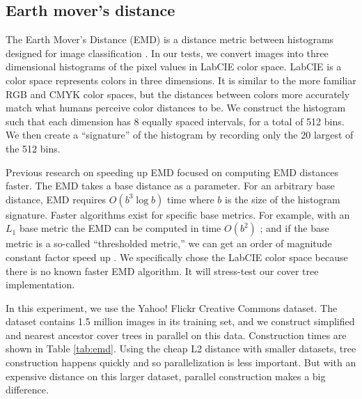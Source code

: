 \documentclass[thesis.tex]{subfiles}
\begin{document}
\subsection{Earth mover's distance}

The Earth Mover's Distance (EMD) is a distance metric between histograms designed for image classification \cite{Rubner1998}.
In our tests, we convert images into three dimensional histograms of the pixel values in LabCIE color space.
LabCIE is a color space represents colors in three dimensions.
It is similar to the more familiar RGB and CMYK color spaces,
but the distances between colors more accurately match what humans perceive color distances to be.
We construct the histogram such that each dimension has 8 equally spaced intervals, for a total of 512 bins.
We then create a ``signature'' of the histogram by recording only the 20 largest of the 512 bins.

Previous research on speeding up EMD focused on computing EMD distances faster.
The EMD takes a base distance as a parameter.
For an arbitrary base distance, EMD requires $O(b^3\log b)$ time where $b$ is the size of the histogram signature.
Faster algorithms exist for specific base metrics.
For example, with an $L_1$ base metric the EMD can be computed in time $O(b^2)$ \citep{Ling07}; and if the base metric is a so-called ``thresholded metric,'' we can get an order of magnitude constant factor speed up \citep{Pele2009}.
We specifically chose the LabCIE color space because there is no known faster EMD algorithm.
It will stress-test our cover tree implementation.

In this experiment, we use the Yahoo! Flickr Creative Commons dataset.
The dataset contains 1.5 million images in its training set,
and we construct simplified and nearest ancestor cover trees in parallel on this data.
Construction times are shown in Table \ref{tab:emd}.
Using the cheap L2 distance with smaller datasets, tree construction happens quickly and so parallelization is less important.
But with an expensive distance on this larger dataset, parallel construction makes a big difference.
\end{document}

